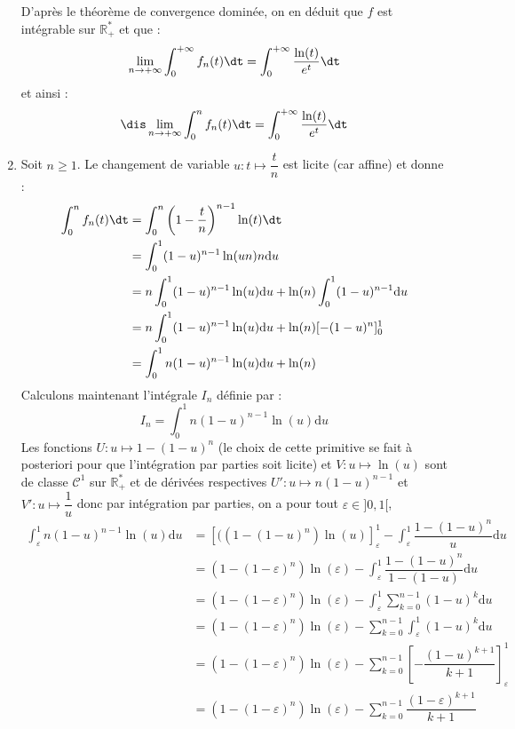 \documentclass[a4paper,10pt]{report}
\begin{document}
\begin{enumerate}
\begin{itemize}
\end{itemize}
D'après le théorème de convergence dominée, on en déduit que $f$ est intégrable sur $\mathbb{R}_+^{*}$ et que :
$$ \lim_{n \rightarrow + \infty} \int_{0}^{+ \infty} f_n(t) \dt = \int_{0}^{+ \infty} \dfrac{\ln(t)}{e^t} \dt$$
et ainsi :
$$\dis \lim_{n \rightarrow + \infty} \int_{0}^n f_n(t) \dt = \int_{0}^{+ \infty} \dfrac{\ln(t)}{e^t} \dt$$
\item Soit $n \geq 1$. Le changement de variable $u : t \mapsto \dfrac{t}{n}$ est licite (car affine) et donne :
\begin{align*}
\int_{0}^n f_n(t) \dt & = \int_{0}^n \left(1 - \dfrac{t}{n}\right)^{n-1} \ln(t) \dt \\
& = \int_{0}^1  (1-u)^{n-1} \ln(un) n \textrm{d}u \\
& = n \int_{0}^1  (1-u)^{n-1} \ln(u) \textrm{d}u  +  \ln(n) \int_{0}^1  (1-u)^{n-1} \textrm{d}u \\
& = n \int_{0}^1  (1-u)^{n-1} \ln(u) \textrm{d}u +  \ln(n) [-(1-u)^n ]_0^1 \\
& =  \int_{0}^1 n (1-u)^{n-1} \ln(u) \textrm{d}u +  \ln(n) 
\end{align*}
Calculons maintenant l'intégrale $I_n$ définie par :
$$ I_n = \int_{0}^1  n(1-u)^{n-1} \ln(u) \textrm{d}u$$
Les fonctions $U : u \mapsto 1-(1-u)^n$ (le choix de cette primitive se fait à posteriori pour que l'intégration par parties soit licite) et $V : u \mapsto \ln(u)$ sont de classe $\mathcal{C}^1$ sur $\mathbb{R}_+^{*}$ et de dérivées respectives $U' : u \mapsto n(1-u)^{n-1}$ et $V' : u \mapsto \dfrac{1}{u}$ donc par intégration par parties, on a pour tout $\varepsilon \in ]0,1[$,
\begin{align*}
 \int_{\varepsilon}^1 n (1-u)^{n-1} \ln(u) \textrm{d}u & = [((1-(1-u)^n)\ln(u)]_{\varepsilon}^1 - \int_{\varepsilon}^1 \dfrac{1-(1-u)^n}{u} \textrm{d}u \\
 & = (1-(1- \varepsilon)^n)\ln(\varepsilon) - \int_{\varepsilon}^1 \dfrac{1-(1-u)^n}{1-(1-u)} \textrm{d}u \\ 
 & = (1-(1- \varepsilon)^n)\ln(\varepsilon)  - \int_{\varepsilon}^1  \sum_{k=0}^{n-1} (1-u)^k \textrm{d}u \\ 
 & = (1-(1- \varepsilon)^n)\ln(\varepsilon)  - \sum_{k=0}^{n-1} \int_{\varepsilon}^1   (1-u)^k \textrm{d}u \\ 
 & = (1-(1- \varepsilon)^n)\ln(\varepsilon)  - \sum_{k=0}^{n-1} \left[ -\dfrac{(1-u)^{k+1}}{k+1}\right]_{\varepsilon}^1 \\
 & = (1-(1- \varepsilon)^n)\ln(\varepsilon)  - \sum_{k=0}^{n-1} \dfrac{(1-\varepsilon)^{k+1}}{k+1} 

\end{align*}
\end{enumerate}
\end{document}
